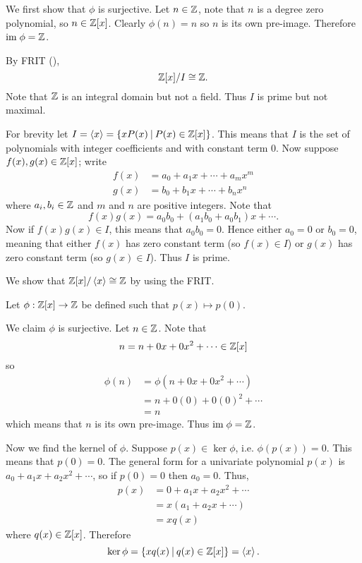 \begin{questions}
\begin{partquestions}{\roman*}
        \item We first show that $\phi$ is surjective. Let $n \in \mathbb{Z}$, note that $n$ is a degree zero polynomial, so $n \in \mathbb{Z}[x]$. Clearly $\phi(n) = n$ so $n$ is its own pre-image. Therefore $\mathrm{im}\;\phi = \mathbb{Z}$.
        
        By FRIT (),
        \[
            \mathbb{Z}[x]/I \cong \mathbb{Z}.
        \]
        Note that $\mathbb{Z}$ is an integral domain but not a field. Thus $I$ is prime but not maximal.
    \end{partquestions}
    
    \item For brevity let $I = \princ{x} = \{xP(x) \vert P(x) \in \Z[x]\}$. This means that $I$ is the set of polynomials with integer coefficients and with constant term 0. Now suppose $f(x), g(x) \in \mathbb{Z}[x]$; write
    \begin{align*}
        f(x) &= a_0 + a_1x + \cdots + a_mx^m\\
        g(x) &= b_0 + b_1x + \cdots + b_nx^n
    \end{align*}
    where $a_i, b_i \in \mathbb{Z}$ and $m$ and $n$ are positive integers. Note that
    \[
        f(x)g(x) = a_0b_0 + (a_1b_0+a_0b_1)x + \cdots.
    \]
    Now if $f(x)g(x) \in I$, this means that $a_0b_0 = 0$. Hence either $a_0 = 0$ or $b_0 = 0$, meaning that either $f(x)$ has zero constant term (so $f(x) \in I$) or $g(x)$ has zero constant term (so $g(x) \in I$). Thus $I$ is prime.

    \item We show that $\mathbb{Z}[x] / \left\langle x\right\rangle \cong \mathbb{Z}$ by using the FRIT.

    Let $\phi: \mathbb{Z}[x] \to \mathbb{Z}$ be defined such that $p(x) \mapsto p(0)$.

    We claim $\phi$ is surjective. Let $n \in \mathbb{Z}$. Note that
    \[
        n = n + 0x + 0x^2 + \cdots \in \mathbb{Z}[x]
    \]
    so
    \begin{align*}
        \phi(n) &= \phi(n + 0x + 0x^2 + \cdots)\\
        &= n + 0(0) + 0(0)^2 + \cdots\\
        &= n
    \end{align*}
    which means that $n$ is its own pre-image. Thus $\mathrm{im}\;\phi = \mathbb{Z}$.

    Now we find the kernel of $\phi$. Suppose $p(x) \in \ker\phi$, i.e. $\phi(p(x)) = 0$. This means that $p(0) = 0$. The general form for a univariate polynomial $p(x)$ is $a_0 + a_1x + a_2x^2 + \cdots$, so if $p(0) = 0$ then $a_0 = 0$. Thus,
    \begin{align*}
        p(x) &= 0 + a_1x + a_2x^2 + \cdots\\
        &= x(a_1 + a_2x + \cdots)\\
        &= xq(x)
    \end{align*}
    where $q(x) \in \mathbb{Z}[x]$. Therefore
    \[
        \ker\phi = \{xq(x) \vert q(x) \in \Z[x]\} = \princ{x}.
    \]


\end{questions}
